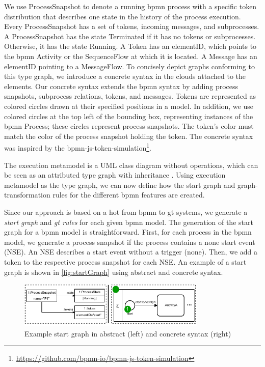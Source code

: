 \documentclass[runningheads]{llncs}
\begin{document}
We use \textsf{ProcessSnapshot} to denote a running \gls*{bpmn} process with a specific token distribution that describes one state in the history of the process execution.
Every \textsf{ProcessSnapshot} has a set of \textsf{tokens}, incoming \textsf{messages}, and \textsf{subprocesses}.
A \textsf{ProcessSnapshot} has the state \textsf{Terminated} if it has no \textsf{tokens} or \textsf{subprocesses}.
Otherwise, it has the state \textsf{Running}.
A \textsf{Token} has an \textsf{elementID}, which points to the \gls*{bpmn} \textsf{Activity} or the \textsf{SequenceFlow} at which it is located.
A \textsf{Message} has an \textsf{elementID} pointing to a \textsf{MessageFlow}.
To concisely depict graphs conforming to this type graph, we introduce a concrete syntax in the clouds attached to the elements.
Our concrete syntax extends the \gls*{bpmn} syntax by adding process snapshots, subprocess relations, tokens, and messages.
Tokens are represented as colored circles drawn at their specified positions in a model.
In addition, we use colored circles at the top left of the bounding box, representing instances of the \gls*{bpmn} \textsf{Process}; these circles represent process snapshots.
The token's color must match the color of the process snapshot holding the token.
The concrete syntax was inspired by the bpmn-js-token-simulation\footnote{\url{https://github.com/bpmn-io/bpmn-js-token-simulation}}.


The execution metamodel is a UML class diagram without operations, which can be seen as an attributed type graph with inheritance \cite{heckelGraphTransformationSoftware2020}.
Using execution metamodel as the type graph, we can now define how the start graph and graph-transformation rules for the different \gls*{bpmn} features are created.

Since our approach is based on a \gls*{hot} from \gls*{bpmn} to \gls*{gt} systems, we generate a \textit{start graph} and \textit{\gls*{gt} rules} for each given \gls*{bpmn} model.
The generation of the start graph for a \gls*{bpmn} model is straightforward.
First, for each process in the \gls*{bpmn} model, we generate a process snapshot if the process contains a none start event (NSE).
An NSE describes a start event without a trigger (none).
Then, we add a token to the respective process snapshot for each NSE.
An example of a start graph is shown in \autoref{fig:startGraph} using abstract and concrete syntax.

\begin{figure}[ht]
    \centering
    \includegraphics[width=0.8\textwidth]{images/startGraph.pdf}
    \caption{Example start graph in abstract (left) and concrete syntax (right)}
    \label{fig:startGraph}
\end{figure}
\end{document}

